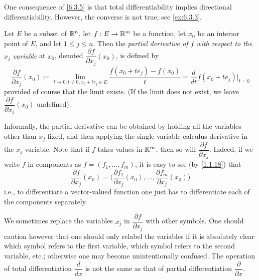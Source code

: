 \begin{rmk}\label{6.3.6}
  One consequence of \cref{6.3.5} is that total differentiability implies directional differentiability.
  However, the converse is not true;
  see \cref{ex:6.3.3}.
\end{rmk}

\begin{defn}\label{6.3.7}
  Let \(E\) be a subset of \(\mathbb{R}^n\), let \(f : E \to \mathbb{R}^m\) be a function, let \(x_0\) be an interior point of \(E\), and let \(1 \leq j \leq n\).
  Then the \emph{partial derivative of \(f\) with respect to the \(x_j\) variable} at \(x_0\), denoted \(\dfrac{\partial f}{\partial x_j}(x_0)\), is defined by
  \[
    \dfrac{\partial f}{\partial x_j}(x_0) \coloneqq \lim_{t \to 0 ; t \neq 0, x_0 + t e_j \in E} \dfrac{f(x_0 + t e_j) - f(x_0)}{t} = \dfrac{d}{dt} f(x_0 + t e_j)|_{t = 0}
  \]
  provided of course that the limit exists.
  (If the limit does not exist, we leave \(\dfrac{\partial f}{\partial x_j}(x_0)\) undefined).
\end{defn}

\begin{ac}\label{ac:6.3.1}
  Informally, the partial derivative can be obtained by holding all the variables other than \(x_j\) fixed, and then applying the single-variable calculus derivative in the \(x_j\) variable.
  Note that if \(f\) takes values in \(\mathbb{R}^m\), then so will \(\dfrac{\partial f}{\partial x_j}\).
  Indeed, if we write \(f\) in components as \(f = (f_1, \dots, f_m)\), it is easy to see (by \cref{1.1.18}) that
  \[
    \dfrac{\partial f}{\partial x_j}(x_0) = \bigg(\dfrac{\partial f_1}{\partial x_j}(x_0), \dots, \dfrac{\partial f_m}{\partial x_j}(x_0)\bigg)
  \]
  i.e., to differentiate a vector-valued function one just has to differentiate each of the components separately.
\end{ac}

\begin{note}
  We sometimes replace the variables \(x_j\) in \(\dfrac{\partial f}{\partial x_j}\) with other symbols.
  One should caution however that one should only relabel the variables if it is absolutely clear which symbol refers to the first variable, which symbol refers to the second variable, etc.;
  otherwise one may become unintentionally confused.
  The operation of total differentiation \(\dfrac{d}{dx}\) is not the same as that of partial differentiation \(\dfrac{\partial}{\partial x}\).
\end{note}

